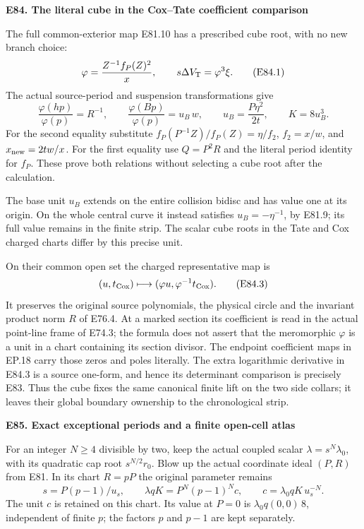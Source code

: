 \par

\medskip\noindent\textbf{E84. The literal cube in the Cox--Tate coefficient comparison}

\par\nobreak

The full common-exterior map E81.10 has a prescribed cube
root, with no new branch choice:
\[
 \varphi=\frac{Z^{-1}f_P(Z)^2}{x},\qquad
          s\Delta V_{\rm T}=\varphi^3\xi.        \tag{E84.1}
\]
The actual source-period and suspension transformations give
\[
 \frac{\varphi(hp)}{\varphi(p)}=R^{-1},\qquad
 \frac{\varphi(Bp)}{\varphi(p)}
                  =u_B\,w,\qquad
 u_B=\frac{P\eta^2}{2t},\qquad K=8u_B^3.        \tag{E84.2}
\]
For the second equality substitute
\(f_P(P^{-1}Z)/f_P(Z)=\eta/f_2\),
\(f_2=x/w\), and \(x_{\rm new}=2tw/x\).
For the first equality use \(Q=P^2R\) and the literal
period identity for \(f_P\). These prove both relations
without selecting a cube root after the calculation.

The base unit \(u_B\) extends on the entire collision
bidisc and has value one at its origin. On the whole
central curve it instead satisfies
\(u_B=-\eta^{-1}\), by E81.9; its full value remains in
the finite strip. The scalar cube roots in the Tate
and Cox charged charts differ by this precise unit.

On their common open set the charged representative map
is
\[
       (u,t_{\rm Cox})\longmapsto
              (\varphi u,\varphi^{-1}t_{\rm Cox}).             \tag{E84.3}
\]
It preserves the original source polynomials, the
physical circle and the invariant product norm \(R\)
of E76.4. At a marked section its coefficient is read
in the actual point-line frame of E74.3; the formula
does not assert that the meromorphic \(\varphi\) is a
unit in a chart containing its section divisor.
The endpoint coefficient maps in EP.18 carry those
zeros and poles literally. The extra logarithmic
derivative in E84.3 is a source one-form, and hence
its determinant comparison is precisely E83.
Thus the cube fixes the same canonical finite lift
on the two side collars; it leaves their global
boundary ownership to the chronological strip.

\par

\medskip\noindent\textbf{E85. Exact exceptional periods and a finite open-cell atlas}

\par\nobreak

For an integer \(N\ge4\) divisible by two, keep the actual
coupled scalar \(\lambda=s^N\lambda_0\), with its quadratic
cap root \(s^{N/2}r_0\). Blow up the actual coordinate
ideal \((P,R)\) from E81. In its chart \(R=pP\) the
original parameter remains
\[
       s=P(p-1)/u_s,\qquad
       \lambda qK=P^N(p-1)^N c,\qquad
       c=\lambda_0 qK\,u_s^{-N}.               \tag{E85.1}
\]
The unit \(c\) is retained on this chart. Its value at
\(P=0\) is \(\lambda_0q(0,0)\,8\), independent of finite
\(p\); the factors \(p\) and \(p-1\) are kept separately.

